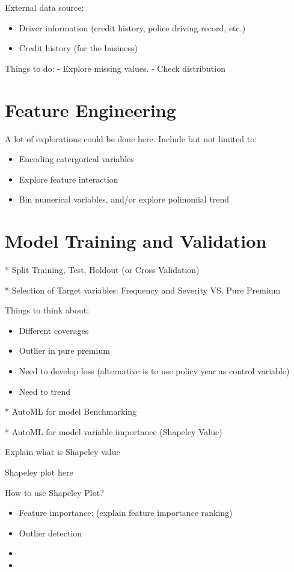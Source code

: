 \documentclass{article}
\begin{document}
External data source:
\begin{itemize}
    \item Driver information (credit history, police driving record, etc.)
    \item Credit history (for the business)
\end{itemize}

Things to do:
- 
Explore missing values. 
- Check distribution


\section{Feature Engineering}

A lot of explorations could be done here. Include but not limited to:
\begin{itemize}
    \item Encoding catergorical variables
    \item Explore feature interaction
    \item Bin numerical variables, and/or explore polinomial trend
\end{itemize}



\section{Model Training and Validation}

* Split Training, Test, Holdout (or Cross Validation)

* Selection of Target variables: Frequency and Severity VS. Pure Premium

Things to think about:
\begin{itemize}
    \item Different coverages
    \item Outlier in pure premium
    \item Need to develop loss (alternative is to use policy year as control variable)
    \item Need to trend
\end{itemize}

* AutoML for model Benchmarking

* AutoML for model variable importance (Shapeley Value)

Explain what is Shapeley value 

Shapeley plot here

How to use Shapeley Plot?

\begin{itemize}
    \item Feature importance: (explain feature importance ranking)
    \item Outlier detection
    \item 
    \item 
\end{itemize}
\end{document}
